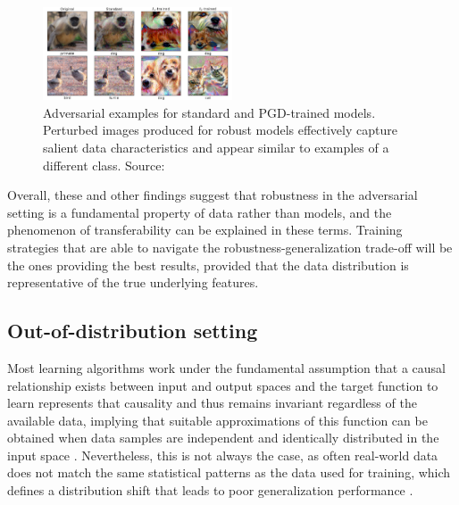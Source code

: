 \begin{figure}[H]
    \centering
    \includegraphics[width=0.5\textwidth]{img/introduction/adversarial_salient.png}
    \caption{Adversarial examples for standard and PGD-trained models.
    Perturbed images produced for robust models 
    effectively capture salient data characteristics and 
    appear similar to examples of a different class. 
    Source: \cite{tsiprasRobustnessMayBe2019}}
    \label{fig:salient_characteristics}
\end{figure}

Overall, these and other findings suggest that robustness in the adversarial setting
is a fundamental property of data rather than models, and
the phenomenon of transferability can be explained in
these terms. Training strategies that are able to navigate the 
robustness-generalization trade-off will be the ones providing 
the best results, provided that the data distribution
is representative of the true underlying features. \\

\subsection{Out-of-distribution setting}\label{sec:intro_ood}

Most learning algorithms work under the fundamental assumption that
a causal relationship exists between input and output spaces and
the target function to learn represents that causality and thus
remains invariant regardless of the available data,
implying that suitable approximations of this 
function can be obtained when data samples are independent 
and identically distributed in the input space
\cite{muandetDomainGeneralizationInvariant2013,quinonero-candelaDatasetShiftMachine2009}. 
Nevertheless, this is not always
the case, as often real-world data does not match the same statistical
patterns as the data used for training, which defines a
distribution shift that leads to poor generalization performance
\cite{zhouDomainGeneralizationSurvey2022,wangGeneralizingUnseenDomains2022,liuOutOfDistributionGeneralizationSurvey2023}. \\

